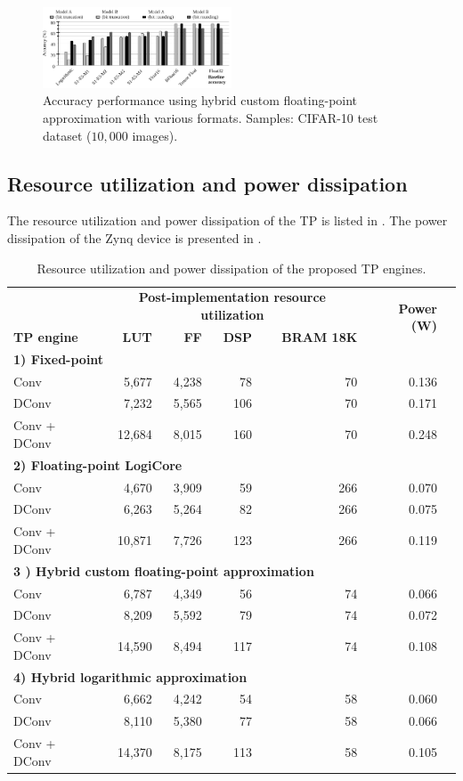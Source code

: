\begin{figure}[t!]
	\centering
	\includegraphics[width=0.5\textwidth]{../figures/all_models_accuracy.pdf}
	\caption{Accuracy performance using hybrid custom floating-point approximation with various formats. Samples: CIFAR-10 test dataset ($10,000$ images).}
	\label{fig:accuracy}
\end{figure}

\subsection{Resource utilization and power dissipation}
The resource utilization and power dissipation of the TP is listed in . The power dissipation of the Zynq device is presented in . 

\begin{table}[!htp]\centering
	\caption{Resource utilization and power dissipation of the proposed TP engines.}\label{tab:resource}
	\scriptsize
\begin{tabular}{lrrrrrr}\toprule
	\textbf{} &\multicolumn{4}{c}{\textbf{Post-implementation resource utilization}} &\multirow{2}{*}{\textbf{Power (W)}} \\\cmidrule{2-5}
	\textbf{TP engine} &\textbf{LUT} &\textbf{FF} &\textbf{DSP} &\textbf{BRAM 18K} & \\\midrule
	\multicolumn{6}{l}{\textbf{1) Fixed-point}} \\
	Conv &5,677 &4,238 &78 &70 &0.136 \\
	DConv &7,232 &5,565 &106 &70 &0.171 \\
	Conv + DConv &12,684 &8,015 &160 &70 &0.248 & \\\midrule
	\multicolumn{6}{l}{\textbf{2) Floating-point LogiCore}} \\
	Conv &4,670 &3,909 &59 &266 &0.070 \\
	DConv &6,263 &5,264 &82 &266 &0.075 \\
	Conv + DConv &10,871 &7,726 &123 &266 &0.119 \\\midrule
	\multicolumn{6}{l}{\textbf{3 ) Hybrid custom floating-point approximation}} \\
	Conv &6,787 &4,349 &56 &74 &0.066 \\
	DConv &8,209 &5,592 &79 &74 &0.072 \\
	Conv + DConv &14,590 &8,494 &117 &74 &0.108 & \\\midrule
	\multicolumn{6}{l}{\textbf{4) Hybrid logarithmic approximation}} \\
	Conv &6,662 &4,242 &54 &58 &0.060 \\
	DConv &8,110 &5,380 &77 &58 &0.066 \\
	Conv + DConv &14,370 &8,175 &113 &58 &0.105 \\
	\bottomrule
\end{tabular}
\end{table}

